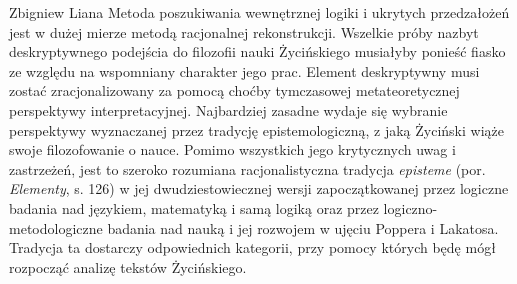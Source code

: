\begin{artplenv}{Zbigniew Liana}
Metoda poszukiwania wewnętrznej logiki i ukrytych przedzałożeń jest w dużej mierze metodą racjonalnej rekonstrukcji.
Wszelkie próby nazbyt deskryptywnego podejścia do filozofii nauki Życińskiego musiałyby ponieść fiasko ze względu na
wspomniany charakter jego prac. Element deskryptywny musi zostać zracjonalizowany za pomocą choćby tymczasowej
metateoretycznej perspektywy interpretacyjnej. Najbardziej zasadne wydaje się wybranie perspektywy wyznaczanej przez
tradycję epistemologiczną, z jaką Życiński wiąże swoje filozofowanie o nauce. Pomimo wszystkich jego krytycznych uwag i
zastrzeżeń, jest to szeroko rozumiana racjonalistyczna tradycja \textit{episteme} (por. \textit{Elementy}, s. 126) w jej
dwudziestowiecznej wersji zapoczątkowanej przez logiczne badania nad językiem, matematyką i samą logiką oraz przez
logiczno-metodologiczne badania nad nauką i jej rozwojem w ujęciu Poppera i Lakatosa. Tradycja ta dostarczy
odpowiednich kategorii, przy pomocy których będę mógł rozpocząć analizę tekstów Życińskiego. 


\end{artplenv}
